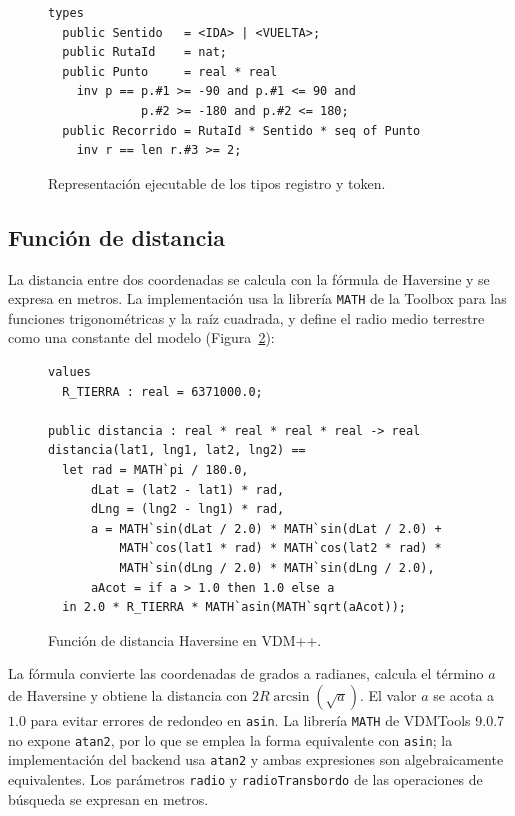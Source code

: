 \begin{figure}[!t]
\centering
\begin{lstlisting}
types
  public Sentido   = <IDA> | <VUELTA>;
  public RutaId    = nat;
  public Punto     = real * real
    inv p == p.#1 >= -90 and p.#1 <= 90 and
             p.#2 >= -180 and p.#2 <= 180;
  public Recorrido = RutaId * Sentido * seq of Punto
    inv r == len r.#3 >= 2;
\end{lstlisting}
\caption{Representación ejecutable de los tipos registro y token.}
\label{fig:codigo-tuplas}
\end{figure}

\subsection{Función de distancia}
\label{sec:distancia}

La distancia entre dos coordenadas se calcula con la fórmula de Haversine y se expresa en metros. La implementación usa la librería \texttt{MATH} de la Toolbox para las funciones trigonométricas y la raíz cuadrada, y define el radio medio terrestre como una constante del modelo (Figura~\ref{fig:codigo-haversine}):

\begin{figure}[!t]
\centering
\begin{lstlisting}
values
  R_TIERRA : real = 6371000.0;

public distancia : real * real * real * real -> real
distancia(lat1, lng1, lat2, lng2) ==
  let rad = MATH`pi / 180.0,
      dLat = (lat2 - lat1) * rad,
      dLng = (lng2 - lng1) * rad,
      a = MATH`sin(dLat / 2.0) * MATH`sin(dLat / 2.0) +
          MATH`cos(lat1 * rad) * MATH`cos(lat2 * rad) *
          MATH`sin(dLng / 2.0) * MATH`sin(dLng / 2.0),
      aAcot = if a > 1.0 then 1.0 else a
  in 2.0 * R_TIERRA * MATH`asin(MATH`sqrt(aAcot));
\end{lstlisting}
\caption{Función de distancia Haversine en VDM++.}
\label{fig:codigo-haversine}
\end{figure}

La fórmula convierte las coordenadas de grados a radianes, calcula el término \(a\) de Haversine y obtiene la distancia con \(2R\arcsin(\sqrt{a})\). El valor \(a\) se acota a \(1.0\) para evitar errores de redondeo en \texttt{asin}. La librería \texttt{MATH} de VDMTools 9.0.7 no expone \texttt{atan2}, por lo que se emplea la forma equivalente con \texttt{asin}; la implementación del backend usa \texttt{atan2} y ambas expresiones son algebraicamente equivalentes. Los parámetros \texttt{radio} y \texttt{radioTransbordo} de las operaciones de búsqueda se expresan en metros.

